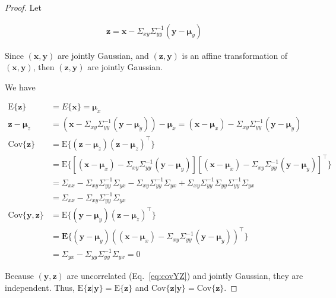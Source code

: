 \begin{proof}
    Let

    \begin{align}
        \mathbf{z}=\mathbf{x}-\Sigma_{xy}\Sigma_{yy}^{-1}(\mathbf{y}-\boldsymbol{\mu}_y)\label{eq:z}
    \end{align}

    Since $(\mathbf{x},\mathbf{y})$ are jointly Gaussian, and $(\mathbf{z},\mathbf{y})$
    is an affine transformation of $(\mathbf{x},\mathbf{y})$, then
    $(\mathbf{z},\mathbf{y})$ are jointly Gaussian.

    We have

    \begin{align}
        \text{E}\{\mathbf{z}\}&=E\{\mathbf{x}\}=\boldsymbol{\mu}_x\nonumber\\
        \mathbf{z}-\boldsymbol{\mu}_z&=\left(\mathbf{x}-\Sigma_{xy}\Sigma_{yy}^{-1}(\mathbf{y}-\boldsymbol{\mu}_y)\right)-\boldsymbol{\mu}_x=(\mathbf{x}-\boldsymbol{\mu}_x)-\Sigma_{xy}\Sigma_{yy}^{-1}(\mathbf{y}-\boldsymbol{\mu}_y)\nonumber\\
        \text{Cov}\{\mathbf{z}\}&=\text{E}\{(\mathbf{z}-\boldsymbol{\mu}_z)(\mathbf{z}-\boldsymbol{\mu}_z)^\intercal\}\nonumber\\
                                &=\text{E}\{\left[(\mathbf{x}-\boldsymbol{\mu}_x)-\Sigma_{xy}\Sigma_{yy}^{-1}(\mathbf{y}-\boldsymbol{\mu}_y)\right]\left[(\mathbf{x}-\boldsymbol{\mu}_x)-\Sigma_{xy}\Sigma_{yy}^{-1}(\mathbf{y}-\boldsymbol{\mu}_y)\right]^\intercal\}\nonumber\\
                                &=\Sigma_{xx}-\Sigma_{xy}\Sigma_{yy}^{-1}\Sigma_{yx}-\Sigma_{xy}\Sigma_{yy}^{-1}\Sigma_{yx}+\Sigma_{xy}\Sigma_{yy}^{-1}\Sigma_{yy}\Sigma_{yy}^{-1}\Sigma_{yx}\nonumber\\
                                &=\Sigma_{xx}-\Sigma_{xy}\Sigma_{yy}^{-1}\Sigma_{yx}\nonumber\\
        \text{Cov}\{\mathbf{y},\mathbf{z}\}&=\text{E}\{(\mathbf{y}-\boldsymbol{\mu}_y)(\mathbf{z}-\boldsymbol{\mu}_z)^\intercal\}\nonumber\\
                                &=\textbf{E}\{(\mathbf{y}-\boldsymbol{\mu}_y)((\mathbf{x}-\boldsymbol{\mu}_x)-\Sigma_{xy}\Sigma_{yy}^{-1}(\mathbf{y}-\boldsymbol{\mu}_y))^\intercal\}\nonumber\\
                                &=\Sigma_{yx}-\Sigma_{yy}\Sigma_{yy}^{-1}\Sigma_{yx}=0\label{eq:covYZ}
    \end{align}

    Because $(\mathbf{y},\mathbf{z})$ are uncorrelated (Eq.~\ref{eq:covYZ}) and
    jointly Gaussian, they are independent. Thus,
    $\text{E}\{\mathbf{z}|\mathbf{y}\}=\text{E}\{\mathbf{z}\}$ and
    $\text{Cov}\{\mathbf{z}|\mathbf{y}\}=\text{Cov}\{\mathbf{z}\}$.


\end{proof}
